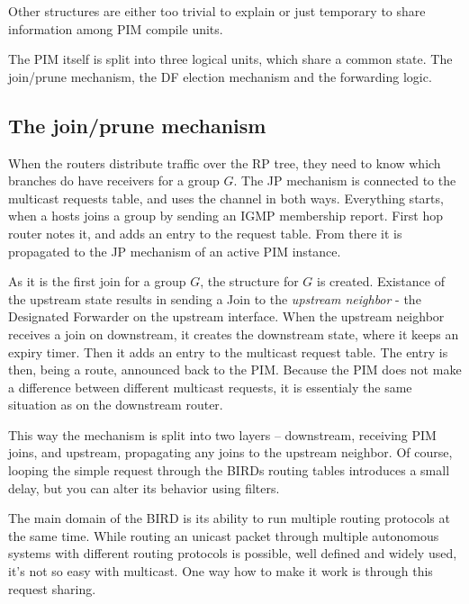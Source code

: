 \noindent Other structures are either too trivial to explain or just temporary
to share information among PIM compile units.

The PIM itself is split into three logical units, which share a common state.
The join/prune mechanism, the DF election mechanism and the forwarding logic.

\begin{figure}[htp]
\centering
\vskip 6cm
\caption{}
\label{pim-parts}
\end{figure}

\subsection{The join/prune mechanism}
When the routers distribute traffic over the RP tree, they need to know which
branches do have receivers for a group $G$. The JP mechanism is connected to
the multicast requests table, and uses the channel in both ways. Everything
starts, when a hosts joins a group by sending an IGMP membership report. First
hop router notes it, and adds an entry to the request table. From there it is
propagated to the JP mechanism of an active PIM instance.

As it is the first join for a group $G$, the  structure for $G$ is
created. Existance of the upstream state results in sending a Join to the
\emph{upstream neighbor} - the Designated Forwarder on the upstream interface.
When the upstream neighbor receives a join on downstream, it creates the
downstream state, where it keeps an expiry timer. Then it adds an entry to the
multicast request table. The entry is then, being a route, announced back to
the PIM. Because the PIM does not make a difference between different multicast
requests, it is essentialy the same situation as on the downstream router.

\label{why-pim-mreq}
This way the mechanism is split into two layers -- downstream, receiving PIM
joins, and upstream, propagating any joins to the upstream neighbor. Of course,
looping the simple request through the BIRDs routing tables introduces a small
delay, but you can alter its behavior using filters.

The main domain of the BIRD is its ability to run multiple routing protocols at
the same time. While routing an unicast packet through multiple autonomous
systems with different routing protocols is possible, well defined and widely
used, it's not so easy with multicast. One way how to make it work is through
this request sharing.

